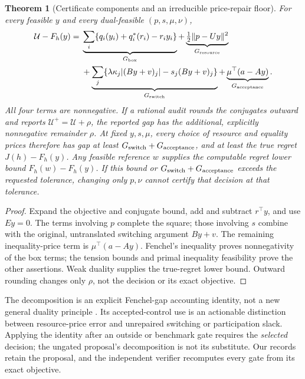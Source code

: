 \documentclass[11pt,letterpaper]{article}
\newtheorem{theorem}{Theorem}[section]
\theoremstyle{definition}
\newcommand{\1}{\mathbf 1}
\begin{document}
\begin{theorem}[Certificate components and an irreducible price-repair floor]\label{thm:r22-decomposition}
For every feasible $y$ and every dual-feasible $(p,s,\mu,\nu)$,
\begin{align}
 \mathcal U-F_h(y)
 ={}&\underbrace{\sum_i\{q_i(y_i)+q_i^*(r_i)-r_iy_i\}}_{G_{\rm box}}
 +\underbrace{\tfrac12\|p-Uy\|^2}_{G_{\rm resource}}\nonumber\\
 &+\underbrace{\sum_j\{\lambda\kappa_j|(By+v)_j|-s_j(By+v)_j\}}_{G_{\rm switch}}
 +\underbrace{\mu^\top(a-Ay)}_{G_{\rm acceptance}}.\label{eq:r22-components}
\end{align}
All four terms are nonnegative. If a rational audit rounds the conjugates outward and reports $\mathcal U^+=\mathcal U+\rho$, the reported gap has the additional, explicitly nonnegative remainder $\rho$. At fixed $y,s,\mu$, every choice of resource and equality prices therefore has gap at least
$G_{\rm switch}+G_{\rm acceptance}$, and at least the true regret $J(h)-F_h(y)$. Any feasible reference $w$ supplies the computable regret lower bound $F_h(w)-F_h(y)$. If this bound or $G_{\rm switch}+G_{\rm acceptance}$ exceeds the requested tolerance, changing only $p,\nu$ cannot certify that decision at that tolerance.
\end{theorem}
\begin{proof}
Expand the objective and conjugate bound, add and subtract $r^\top y$, and use $Ey=0$. The terms involving $p$ complete the square; those involving $s$ combine with the original, untranslated switching argument $By+v$. The remaining inequality-price term is $\mu^\top(a-Ay)$. Fenchel's inequality proves nonnegativity of the box terms; the tension bounds and primal inequality feasibility prove the other assertions. Weak duality supplies the true-regret lower bound. Outward rounding changes only $\rho$, not the decision or its exact objective.
\end{proof}
The decomposition is an explicit Fenchel-gap accounting identity, not a new general duality principle \citep{BoydVandenberghe2004}. Its accepted-control use is an actionable distinction between resource-price error and unrepaired switching or participation slack. Applying the identity after an outside or benchmark gate requires the \emph{selected} decision; the ungated proposal's decomposition is not its substitute. Our records retain the proposal, and the independent verifier recomputes every gate from its exact objective.
\end{document}
